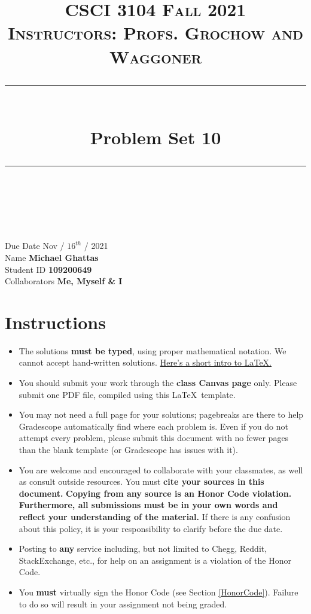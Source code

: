 \documentclass[11pt]{article}
\title{
\normalfont \normalsize 
\textsc{CSCI 3104 Fall 2021 \\ 
Instructors: Profs. Grochow and Waggoner} \\
[10pt] 
\rule{\linewidth}{0.5pt} \\[6pt] 
\huge Problem Set 10 \\
\rule{\linewidth}{2pt}  \\[10pt]
}
\date{}
\theoremstyle{definition}
\theoremstyle{definition}
\theoremstyle{definition}
\begin{document}
\maketitle


\noindent
Due Date \dotfill Nov / $16^{th}$ / 2021 \\
Name \dotfill \textbf{Michael Ghattas} \\
Student ID \dotfill \textbf{109200649} \\
Collaborators \dotfill \textbf{Me, Myself \& I}

\tableofcontents

\section{Instructions}
 \begin{itemize}
	\item The solutions \textbf{must be typed}, using proper mathematical notation. We cannot accept hand-written solutions. \href{http://ece.uprm.edu/~caceros/latex/introduction.pdf}{Here's a short intro to \LaTeX.}
	\item You should submit your work through the \textbf{class Canvas page} only. Please submit one PDF file, compiled using this \LaTeX \ template.
	\item You may not need a full page for your solutions; pagebreaks are there to help Gradescope automatically find where each problem is. Even if you do not attempt every problem, please submit this document with no fewer pages than the blank template (or Gradescope has issues with it).

	\item You are welcome and encouraged to collaborate with your classmates, as well as consult outside resources. You must \textbf{cite your sources in this document.} \textbf{Copying from any source is an Honor Code violation. Furthermore, all submissions must be in your own words and reflect your understanding of the material.} If there is any confusion about this policy, it is your responsibility to clarify before the due date. 

	\item Posting to \textbf{any} service including, but not limited to Chegg, Reddit, StackExchange, etc., for help on an assignment is a violation of the Honor Code.

	\item You \textbf{must} virtually sign the Honor Code (see Section \ref{HonorCode}). Failure to do so will result in your assignment not being graded.
\end{itemize}
\end{document}
